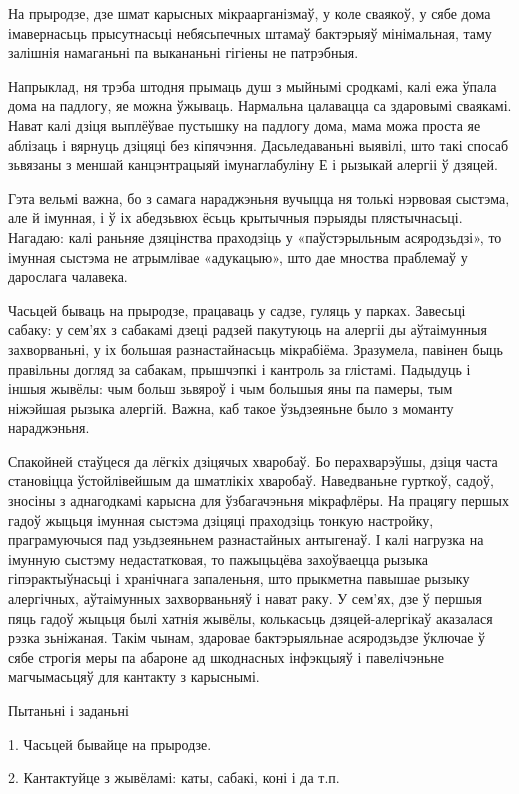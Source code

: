 На прыродзе, дзе шмат карысных мікраарганізмаў, у коле сваякоў, у сябе дома імавернасьць прысутнасьці небясьпечных штамаў бактэрыяў мінімальная, таму залішнія намаганьні па выкананьні гігіены не патрэбныя.

Напрыклад, ня трэба штодня прымаць душ з мыйнымі сродкамі, калі ежа ўпала дома на падлогу, яе можна ўжываць. Нармальна цалавацца са здаровымі сваякамі. Нават калі дзіця выплёўвае пустышку на падлогу дома, мама можа проста яе аблізаць і вярнуць дзіцяці без кіпячэння. Дасьледаваньні выявілі, што такі спосаб зьвязаны з меншай канцэнтрацыяй імунаглабуліну Е і рызыкай алергіі ў дзяцей.

Гэта вельмі важна, бо з самага нараджэньня вучыцца ня толькі нэрвовая сыстэма, але й імунная, і ў іх абедзьвюх ёсьць крытычныя пэрыяды плястычнасьці. Нагадаю: калі раньняе дзяцінства праходзіць у «паўстэрыльным асяродзьдзі», то імунная сыстэма не атрымлівае «адукацыю», што дае мноства праблемаў у дарослага чалавека.

Часьцей бываць на прыродзе, працаваць у садзе, гуляць у парках. Завесьці сабаку: у сем'ях з сабакамі дзеці радзей пакутуюць на алергіі ды аўтаімунныя захворваньні, у іх большая разнастайнасьць мікрабіёма. Зразумела, павінен быць правільны догляд за сабакам, прышчэпкі і кантроль за глістамі. Падыдуць і іншыя жывёлы: чым больш зьвяроў і чым большыя яны па памеры, тым ніжэйшая рызыка алергій. Важна, каб такое ўзьдзеяньне было з моманту нараджэньня. 

Спакойней стаўцеся да лёгкіх дзіцячых хваробаў. Бо перахварэўшы, дзіця часта становіцца ўстойлівейшым да шматлікіх хваробаў. Наведваньне гурткоў, садоў, зносіны з аднагодкамі карысна для ўзбагачэньня мікрафлёры. На працягу першых гадоў жыцьця імунная сыстэма дзіцяці праходзіць тонкую настройку, праграмуючыся пад узьдзеяньнем разнастайных антыгенаў. І калі нагрузка на імунную сыстэму недастатковая, то пажыцьцёва захоўваецца рызыка гіпэрактыўнасьці і хранічнага запаленьня, што прыкметна павышае рызыку алергічных, аўтаімунных захворваньняў і нават раку. У сем'ях, дзе ў першыя пяць гадоў жыцьця былі хатнія жывёлы, колькасьць дзяцей-алергікаў аказалася рэзка зьніжаная. Такім чынам, здаровае бактэрыяльнае асяродзьдзе ўключае ў сябе строгія меры па абароне ад шкоднасных інфэкцыяў і павелічэньне магчымасьцяў для кантакту з карыснымі.

Пытаньні і заданьні

1. Часьцей бывайце на прыродзе.

2. Кантактуйце з жывёламі: каты, сабакі, коні і да т.п.

